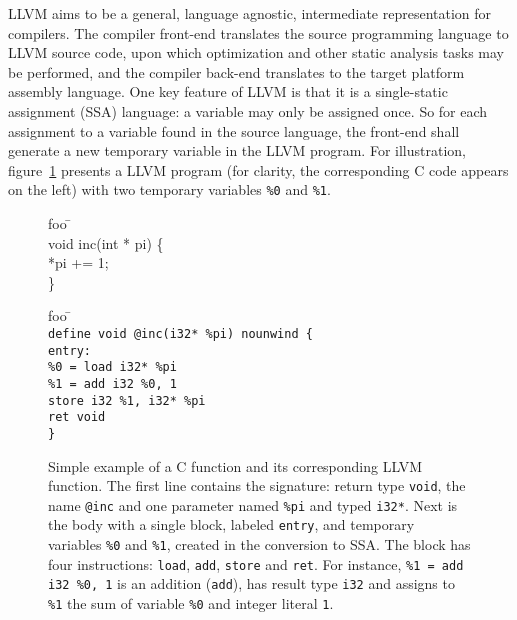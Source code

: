 \documentclass{llncs}
\newcommand{\llvm}[1]{\texttt{#1}}
\begin{document}
LLVM aims to be a general, language agnostic, intermediate representation for
compilers. The compiler front-end translates the source programming language to
LLVM source code, upon which optimization and other static analysis tasks may be
performed, and the compiler back-end translates to the target platform assembly
language. One key feature of LLVM is that it is a single-static assignment (SSA)
language: a variable may only be assigned once. So for each assignment to a
variable found in the source language, the front-end shall generate a new
temporary variable in the LLVM program. For illustration,
figure~\ref{fig:ex-llvm} presents a LLVM program (for clarity, the corresponding
C code appears on the left) with two temporary variables \llvm{\%0} and
\llvm{\%1}.
\begin{figure}
\vspace*{-3em}
  \begin{minipage}[t]{.3\textwidth}
    \begin{tabbing}
      foo \= \kill  \\
      void inc(int * pi) \{\\
      \> *pi += 1; \\
      \}\end{tabbing}
  \end{minipage}
  \hfill
  \begin{minipage}[t]{.6\textwidth}
    \begin{tabbing}
      foo \= \kill  \\
      \llvm{define void @inc(i32* \%pi) nounwind \{} \\
      \llvm{entry:}                      \\
      \> \llvm{\%0 = load i32* \%pi}     \\
      \> \llvm{\%1 = add i32 \%0, 1}     \\
      \> \llvm{store i32 \%1, i32* \%pi} \\
      \> \llvm{ret void} \\
      \llvm{\}}
    \end{tabbing}
  \end{minipage}
  \caption{Simple example of a C function and its corresponding LLVM function.
    The first line contains the signature: return type \llvm{void}, the name
    \llvm{@inc} and one parameter named \llvm{\%pi} and typed \llvm{i32*}.  Next
    is the body with a single block, labeled \llvm{entry}, and temporary
    variables \llvm{\%0} and \llvm{\%1}, created in the conversion to SSA. The
    block has four instructions: \llvm{load}, \llvm{add}, \llvm{store} and
    \llvm{ret}. For instance, \llvm{\%1 = add i32 \%0, 1} is an addition
    (\llvm{add}), has result type \llvm{i32} and assigns to
    \llvm{\%1} the sum of variable \llvm{\%0} and integer
    literal \llvm{1}.}
  \label{fig:ex-llvm}
\end{figure}
\end{document}
